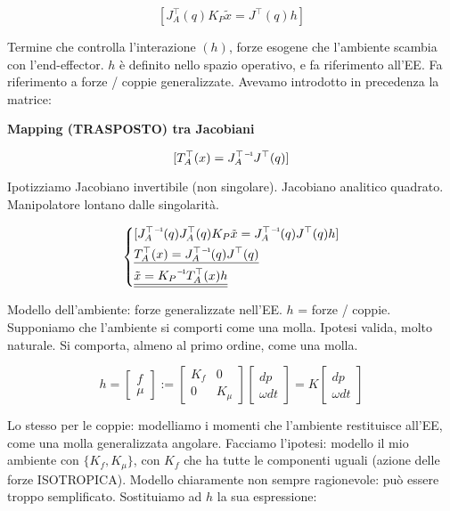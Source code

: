 \[
	[J_A^\top(q)K_P\tilde{x} = J^\top(q)h]
\]

Termine che controlla l'interazione $(h)$, forze esogene che l'ambiente scambia con l'end-effector. $h$ è definito nello spazio operativo, e fa riferimento all'EE. Fa riferimento a forze / coppie generalizzate. Avevamo introdotto in precedenza la matrice:

\begin{prop}{\textbf{Mapping (TRASPOSTO) tra Jacobiani}}

\[
	[T_A^\top(x) = \inv{J_A^\top}J^\top(q)]
\]

\end{prop}

Ipotizziamo Jacobiano invertibile (non singolare). Jacobiano analitico quadrato. Manipolatore lontano dalle singolarità.

\[
	\left\{
	\begin{aligned}
	&[\inv{J_A^\top}(q)J_A^\top(q)K_P\tilde{x} = \inv{J_A^\top}(q)J^\top(q)h]\\
	&\underline{T_A^\top(x) = \inv{J_A^\top}(q)J^\top(q)}\\
	&\underline{\underline{\tilde{x} = \inv{K_P}T_A^\top(x)h}}
	\end{aligned}
	\right.
\]

Modello dell'ambiente: forze generalizzate nell'EE. $h$ = forze / coppie. Supponiamo che l'ambiente si comporti come una molla. Ipotesi valida, molto naturale. Si comporta, almeno al primo ordine, come una molla.

\[
	h = \begin{bmatrix}f\\\mu\end{bmatrix} := \begin{bmatrix}K_f&0\\0&K_\mu\end{bmatrix}\begin{bmatrix}dp\\\omega dt\end{bmatrix} = K\begin{bmatrix}dp\\\omega dt\end{bmatrix}
\]

Lo stesso per le coppie: modelliamo i momenti che l'ambiente restituisce all'EE, come una molla generalizzata angolare.
Facciamo l'ipotesi: modello il mio ambiente con $\{K_f,K_\mu\}$, con $K_f$ che ha tutte le componenti uguali (azione delle forze ISOTROPICA). Modello chiaramente non sempre ragionevole: può essere troppo semplificato. Sostituiamo ad $h$ la sua espressione:


